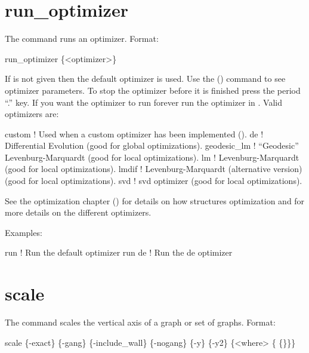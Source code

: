 \section{run_optimizer}
\label{s:run}

The  command runs an optimizer. Format:
\begin{example}
  run_optimizer \{<optimizer>\}
\end{example}

\vskip 10pt 

If  is not given then the default optimizer is used.  Use the 
() command to see optimizer parameters.  To stop the optimizer before it is
finished press the period ``.''  key. If you want the optimizer to run forever run the optimizer in
. Valid optimizers are:
\begin{example}
  custom        ! Used when a custom optimizer has been implemented ().
  de            ! Differential Evolution (good for global optimizations).
  geodesic_lm   ! ``Geodesic'' Levenburg-Marquardt (good for local optimizations).
  lm            ! Levenburg-Marquardt (good for local optimizations).
  lmdif         ! Levenburg-Marquardt (alternative version) (good for local optimizations).
  svd           ! svd optimizer (good for local optimizations).
\end{example}

See the optimization chapter () for details on how \tao structures optimization and for
more details on the different optimizers.

Examples:
\begin{example}
  run         ! Run the default optimizer
  run de      ! Run the de optimizer
\end{example}

\section{scale}
\label{s:scale}

The  command scales the vertical axis of a graph or set of graphs.  Format:
\begin{example}
  scale \{-exact\} \{-gang\} \{-include_wall\} \{-nogang\} 
             \{-y\} \{-y2\} \{<where> \{<value1> \{<value2>\}\}\}
\end{example}

